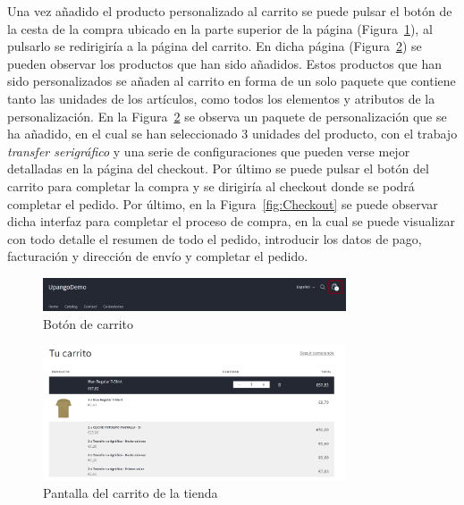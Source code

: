 \documentclass[11pt]{article}
\begin{document}
Una vez añadido el producto personalizado al carrito se puede pulsar el botón de la cesta de la compra ubicado en la parte superior de la página (Figura~\ref{fig:BotonCarrito}), al pulsarlo se redirigiría a la página del carrito.
En dicha página (Figura~\ref{fig:Carrito}) se pueden observar los productos que han sido añadidos. Estos productos que han sido personalizados se añaden al carrito en forma de un solo paquete que contiene
tanto las unidades de los artículos, como todos los elementos y atributos de la personalización.
En la Figura~\ref{fig:Carrito} se observa un paquete de personalización que se ha añadido, en el cual se han seleccionado 3 unidades del producto, con el trabajo \textit{transfer serigráfico} y una serie de configuraciones 
que pueden verse mejor detalladas en la página del checkout. Por último se puede pulsar el botón del carrito para completar la compra y se dirigiría al checkout donde se podrá completar el pedido.
Por último, en la Figura~\ref{fig:Checkout} se puede observar dicha interfaz para completar el proceso de compra, en la cual se puede visualizar con todo detalle el resumen de todo el pedido, introducir los datos de pago, facturación y dirección de envío
y completar el pedido.


\begin{figure}[H]
    \centering
    \includegraphics[width=0.8\textwidth]{imagenes/ManualUsuario/BotonCarrito.png}
    \caption{\label{fig:BotonCarrito}Botón de carrito}
    \vspace{\fill}
\end{figure}

\begin{figure}[H]
    \centering
    \includegraphics[width=0.8\textwidth]{imagenes/ManualUsuario/PantallaCarrito.png}
    \caption{\label{fig:Carrito}Pantalla del carrito de la tienda}
    \vspace{\fill}
\end{figure}
\end{document}
